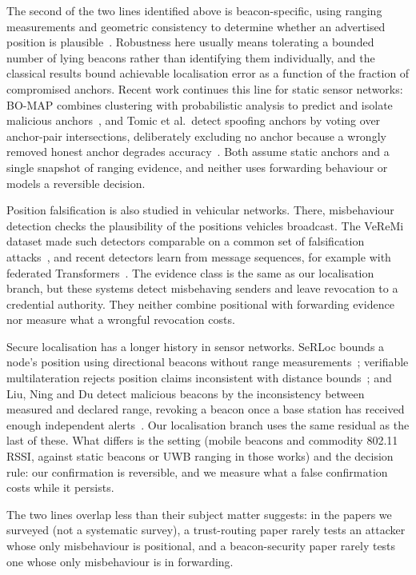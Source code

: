 \documentclass[pdflatex,sn-mathphys-num]{sn-jnl}%
\theoremstyle{thmstyleone}%
\theoremstyle{thmstyletwo}%
\theoremstyle{thmstylethree}%
\begin{document}
The second of the two lines identified above is beacon-specific, using ranging measurements and geometric
consistency to determine whether an advertised position is
plausible~\cite{kuriakose2023embn,liu2008attack}. Robustness here usually
means tolerating a bounded number of lying beacons rather than identifying
them individually, and the classical results bound achievable localisation
error as a function of the fraction of compromised anchors. Recent work
continues this line for static sensor networks: BO-MAP combines clustering
with probabilistic analysis to predict and isolate malicious
anchors~\cite{sreeja2024bomap}, and Tomic et al.\ detect spoofing anchors by
voting over anchor-pair intersections, deliberately excluding no anchor
because a wrongly removed honest anchor degrades
accuracy~\cite{tomic2026voting}. Both assume static anchors and a single
snapshot of ranging evidence, and neither uses forwarding behaviour or models
a reversible decision.

Position falsification is also studied in vehicular networks. There,
misbehaviour detection checks the plausibility of the positions vehicles
broadcast. The VeReMi dataset made such detectors comparable on a common set
of falsification attacks~\cite{vanderheijden2018veremi}, and recent detectors
learn from message sequences, for example with federated
Transformers~\cite{khan2026mofed}. The evidence class is the same as our
localisation branch, but these systems detect misbehaving senders and leave
revocation to a credential authority. They neither combine positional with
forwarding evidence nor measure what a wrongful revocation costs.

Secure localisation has a longer history in sensor networks. SeRLoc bounds a
node's position using directional beacons without range
measurements~\cite{lazos2004serloc}; verifiable multilateration rejects
position claims inconsistent with distance bounds~\cite{capkun2006secure};
and Liu, Ning and Du detect malicious beacons by the inconsistency between
measured and declared range, revoking a beacon once a base station has
received enough independent alerts~\cite{liu2005detecting}. Our localisation
branch uses the same residual as the last of these. What differs is the
setting (mobile beacons and commodity 802.11 RSSI, against static beacons
or UWB ranging in those works) and the decision rule: our confirmation is
reversible, and we measure what a false confirmation costs while it
persists.

The two lines overlap less than their subject matter suggests: in the papers
we surveyed (not a systematic survey), a trust-routing paper rarely tests an
attacker whose only misbehaviour is positional, and a beacon-security paper
rarely tests one whose only misbehaviour is in forwarding.
\end{document}
